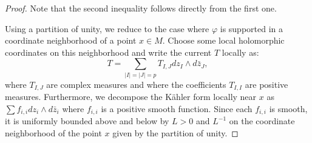 \documentclass[12pt]{amsbook}%
\theoremstyle{definition}
\theoremstyle{remark}
\numberwithin{section}{chapter}
\numberwithin{subsection}{section}
\numberwithin{figure}{chapter}
\begin{document}
{{ %
  
  \begin{proof} Note that the second inequality follows directly from the first one. 
  
  

  Using a partition of unity, we reduce to the case where $\varphi$ is supported in a coordinate neighborhood of a point $x \in M$. Choose some local holomorphic coordinates on this neighborhood and write the current  $T$ locally as: 
  \begin{equation*}
  T = \sum_{|I|=|J|=p} T_{I,J} dz_I \wedge d\bar z_J,
\end{equation*}   
  where $T_{I,J}$ are complex measures and where the coefficients $T_{I,I}$ are positive measures. 
Furthermore, we decompose the K\"ahler form locally near $x $ as $\sum f_{i,i} dz_i \wedge d\bar{z}_{i}$ where $f_{i,i}$ is a positive smooth function.
Since each $f_{i,i}$ is smooth, it is uniformly bounded above and below by $L>0$ and $L^{-1}$ on the coordinate neighborhood of the point $x$ given by the partition of unity. 



\end{proof}}}
\end{document}
